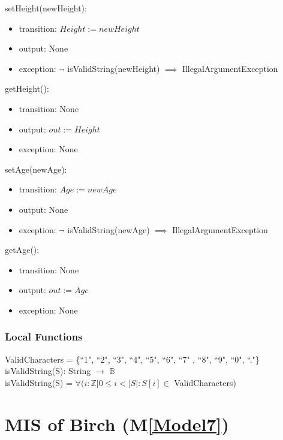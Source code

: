 \documentclass[12pt, titlepage]{article}
\newcommand{\mref}[1]{M\ref{#1}}
\begin{document}
\noindent setHeight(newHeight):
\begin{itemize}
\item transition: $\mathit{Height := newHeight}$
\item output: None
\item exception: $\neg$ isValidString(newHeight) $\implies$
IllegalArgumentException
\end{itemize}

\noindent getHeight():
\begin{itemize}
\item transition: None
\item output: $\mathit{out := Height}$
\item exception: None
\end{itemize}

\noindent setAge(newAge):
\begin{itemize}
\item transition: $\mathit{Age := newAge}$
\item output: None
\item exception: $\neg$ isValidString(newAge) $\implies$
IllegalArgumentException
\end{itemize}

\noindent getAge():
\begin{itemize}
\item transition: None
\item output: $\mathit{out := Age}$
\item exception: None
\end{itemize}

\subsubsection{Local Functions}
ValidCharacters = \{``1", ``2", ``3", ``4", ``5", ``6", ``7"
, ``8", ``9", ``0", ``."\}\\

\noindent isValidString(S): String $\rightarrow$ $\mathbb{B}$ \\

\noindent isValidString(S) = $\forall(i : \mathbb{Z} | 0 \leq
i < |S| : S[i] \in $ ValidCharacters)

\newpage

\renewcommand{\tn}{Birch }
\renewcommand{\tmn}{Birch}
\renewcommand{\constn}{Birch}

\section{MIS of \tn (\mref{Model7})}
\end{document}
